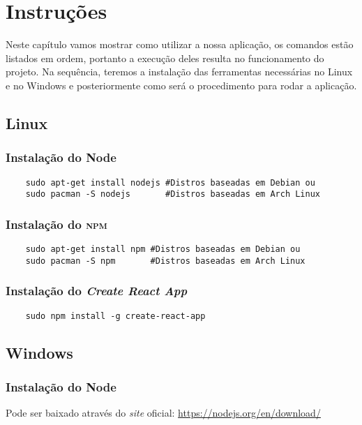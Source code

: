 \chapter{Instruções}
Neste capítulo vamos mostrar como utilizar a nossa aplicação, os comandos estão listados em ordem, portanto a execução deles resulta no funcionamento do projeto. Na sequência, teremos a instalação das ferramentas necessárias no Linux e no Windows e posteriormente como será o procedimento para rodar a aplicação.

\section{Linux}
\subsection{Instalação do Node}
\begin{verbatim}
	sudo apt-get install nodejs #Distros baseadas em Debian ou
	sudo pacman -S nodejs       #Distros baseadas em Arch Linux
\end{verbatim}

\subsection{Instalação do \textsc{npm}}
\begin{verbatim}
	sudo apt-get install npm #Distros baseadas em Debian ou
	sudo pacman -S npm       #Distros baseadas em Arch Linux
\end{verbatim}

\subsection{Instalação do \emph{Create React App}}
\begin{verbatim}
	sudo npm install -g create-react-app
\end{verbatim}

\section{Windows}
\subsection{Instalação do Node}
Pode ser baixado através do \emph{site} oficial:
\href{https://nodejs.org/en/download/}{https://nodejs.org/en/download/}


